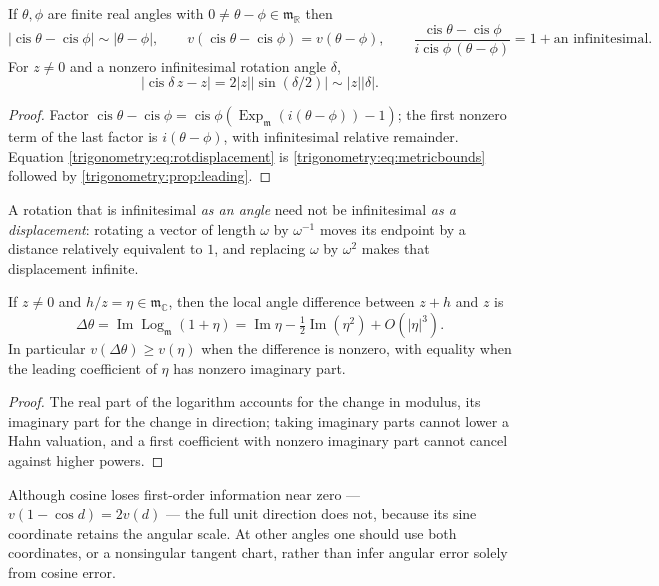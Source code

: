\documentclass[11pt,letterpaper]{article}
\numberwithin{equation}{section}
\theoremstyle{definition}
\theoremstyle{remark}
\newcommand{\R}{\mathbb R}
\newcommand{\C}{\mathbb C}
\newcommand{\mm}{\mathfrak m}
\newcommand{\im}{\operatorname{Im}}
\newcommand{\cis}{\operatorname{cis}}
\newcommand{\Ex}{\operatorname{Exp}_{\mm}}
\newcommand{\Logm}{\operatorname{Log}_{\mm}}
\begin{document}
\begin{corollary}
\label{trigonometry:cor:phaseisometry}
If $\theta,\phi$ are finite real angles with $0\ne\theta-\phi\in\mm_{\R}$ then
\begin{equation}\label{trigonometry:eq:phaseisometry}
 |\cis\theta-\cis\phi|\sim|\theta-\phi|,\qquad
 v(\cis\theta-\cis\phi)=v(\theta-\phi),\qquad
 \frac{\cis\theta-\cis\phi}{i\cis\phi\,(\theta-\phi)}=1+\text{an infinitesimal}.
\end{equation}
For $z\ne0$ and a nonzero infinitesimal rotation angle $\delta$,
\begin{equation}\label{trigonometry:eq:rotdisplacement}
 |\cis\delta\,z-z|=2|z||\sin(\delta/2)|\sim|z||\delta| .
\end{equation}
\end{corollary}
\begin{proof}
Factor $\cis\theta-\cis\phi=\cis\phi(\Ex(i(\theta-\phi))-1)$; the first nonzero term of the last
factor is $i(\theta-\phi)$, with infinitesimal relative remainder. Equation
\cref{trigonometry:eq:rotdisplacement} is \cref{trigonometry:eq:metricbounds} followed by
\cref{trigonometry:prop:leading}.
\end{proof}
A rotation that is infinitesimal \emph{as an angle} need not be infinitesimal \emph{as a
displacement}: rotating a vector of length $\omega$ by $\omega^{-1}$ moves its endpoint by a
distance relatively equivalent to $1$, and replacing $\omega$ by $\omega^2$ makes that displacement
infinite.

\begin{corollary}
\label{trigonometry:cor:directionstability}
If $z\ne0$ and $h/z=\eta\in\mm_{\C}$, then the local angle difference between $z+h$ and $z$ is
\[
 \Delta\theta=\im\Logm(1+\eta)=\im\eta-\tfrac12\im(\eta^2)+O(|\eta|^3).
\]
In particular $v(\Delta\theta)\ge v(\eta)$ when the difference is nonzero, with equality when the
leading coefficient of $\eta$ has nonzero imaginary part.
\end{corollary}
\begin{proof}
The real part of the logarithm accounts for the change in modulus, its imaginary part for the change
in direction; taking imaginary parts cannot lower a Hahn valuation, and a first coefficient with
nonzero imaginary part cannot cancel against higher powers.
\end{proof}

Although cosine loses first-order information near zero --- $v(1-\cos d)=2v(d)$ --- the full unit
direction does not, because its sine coordinate retains the angular scale. At other angles one
should use both coordinates, or a nonsingular tangent chart, rather than infer angular error solely
from cosine error.
\end{document}
